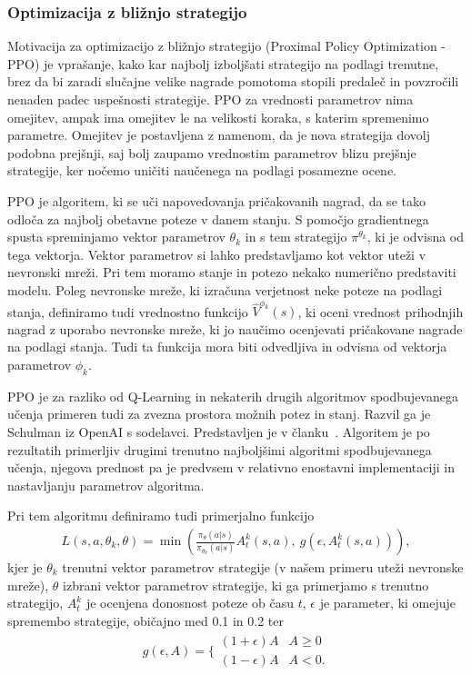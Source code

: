 \subsubsection{Optimizacija z bližnjo strategijo}

Motivacija za optimizacijo z bližnjo strategijo (Proximal Policy Optimization - PPO) je vprašanje, kako kar najbolj izboljšati strategijo na podlagi trenutne, brez da bi zaradi slučajne velike nagrade pomotoma stopili predaleč in povzročili nenaden padec uspešnosti strategije. PPO za vrednosti parametrov nima omejitev, ampak ima omejitev le na velikosti koraka, s katerim spremenimo parametre. Omejitev je postavljena z namenom, da je nova strategija dovolj podobna prejšnji, saj bolj zaupamo vrednostim parametrov blizu prejšnje strategije, ker nočemo uničiti naučenega na podlagi posamezne ocene.

PPO je algoritem, ki se uči napovedovanja pričakovanih nagrad, da se tako odloča za najbolj obetavne poteze v danem stanju. S pomočjo gradientnega spusta spreminjamo vektor parametrov $\theta_k$ in s tem strategijo $\pi^{\theta_k}$, ki je odvisna od tega vektorja. Vektor parametrov si lahko predstavljamo kot vektor uteži v nevronski mreži. Pri tem moramo stanje in potezo nekako numerično predstaviti modelu. Poleg nevronske mreže, ki izračuna verjetnost neke poteze na podlagi stanja, definiramo tudi vrednostno funkcijo $\hat{V}^{\phi_k}(s)$, ki oceni vrednost prihodnjih nagrad z uporabo nevronske mreže, ki jo naučimo ocenjevati pričakovane nagrade na podlagi stanja. Tudi ta funkcija mora biti odvedljiva in odvisna od vektorja parametrov $\phi_k$. 

PPO je za razliko od Q-Learning in nekaterih drugih algoritmov spodbujevanega učenja primeren tudi za zvezna prostora možnih potez in stanj. Razvil ga je Schulman iz OpenAI s sodelavci. Predstavljen je v članku~\cite{ppo-clanek}. Algoritem je po rezultatih primerljiv drugimi trenutno najboljšimi algoritmi spodbujevanega učenja, njegova prednost pa je predvsem v relativno enostavni implementaciji in nastavljanju parametrov algoritma.

Pri tem algoritmu definiramo tudi primerjalno funkcijo
\begin{align}
L(s,a,\theta_k,\theta) = \min\left(\frac{\pi_{\theta}(a|s)}{\pi_{\theta_k}(a|s)}  A_t^k(s,a),~g(\epsilon, A_t^k(s,a))\right), \label{eq:lclip}
\end{align}
kjer je $\theta_k$ trenutni vektor parametrov strategije (v našem primeru uteži nevronske mreže), $\theta$ izbrani vektor parametrov strategije, ki ga primerjamo s trenutno strategijo, $A_t^k$ je ocenjena donosnost poteze ob času $t$, $\epsilon$ je parameter, ki omejuje spremembo strategije, običajno med 0.1 in 0.2 ter
\begin{align}
g(\epsilon, A) = \Big\{
\begin{array}{ll}
(1 + \epsilon) A & A \geq 0 \\
(1 - \epsilon) A & A < 0.
\end{array}
\end{align}


